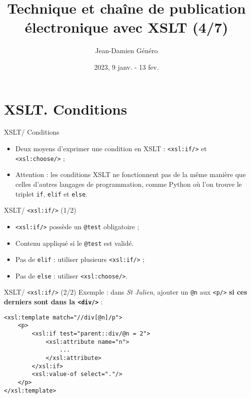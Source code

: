 \documentclass{beamer}
\title{Technique et chaîne de publication électronique avec XSLT (4/7)}
\date{2023, 9 janv. - 13 fev.}
\author{Jean-Damien Généro}
\institute{École nationale des chartes -- M2 TNAH}
\begin{document}
    \maketitle
    
    \section{XSLT. Conditions}

    \begin{frame}{XSLT/ Conditions}
        \Large
        \begin{itemize}
            \item Deux moyens d'exprimer une condition en XSLT : \texttt{<xsl:if/>} et \texttt{<xsl:choose/>} ;
            \bigskip
            \item Attention : les conditions XSLT ne fonctionnent pas de la même manière que celles d'autres langages de programmation, comme Python où l'on trouve le triplet \texttt{if}, \texttt{elif} et \texttt{else}.
        \end{itemize}
    \end{frame}

    \begin{frame}{XSLT/ \texttt{<xsl:if/>} (1/2)}
        \Large
        \begin{itemize}
            \item \texttt{<xsl:if/>} possède un \texttt{@test} obligatoire ;
            \item Contenu appliqué si le \texttt{@test} est validé.
            \bigskip
            \item Pas de \texttt{elif} : utiliser plusieurs \texttt{<xsl:if/>} ;
            \item Pas de \texttt{else} : utiliser \texttt{<xsl:choose/>}.
        \end{itemize}
    \end{frame}

    \begin{frame}[fragile]{XSLT/ \texttt{<xsl:if/>} (2/2)}
        \Large
        Exemple : dans \textit{St Julien}, ajouter un \texttt{@n} aux \texttt{<p/>} \textbf{si ces derniers sont dans la \texttt{<div/>} } :
        \normalsize
        \begin{verbatim}
<xsl:template match="//div[@n]/p">
    <p>
        <xsl:if test="parent::div/@n = 2">
            <xsl:attribute name="n">
                ...
            </xsl:attribute>
        </xsl:if>
        <xsl:value-of select="."/>
    </p>
</xsl:template>
        \end{verbatim}
    \end{frame}
\end{document}

